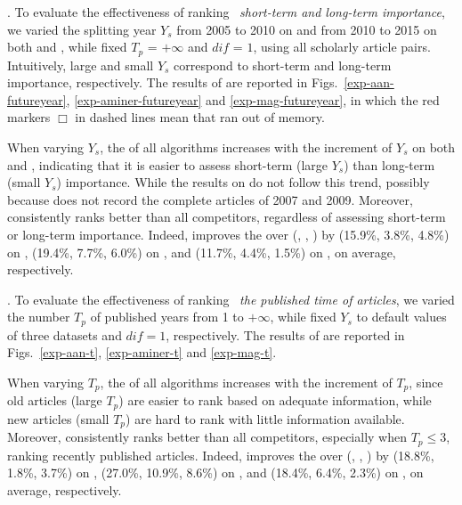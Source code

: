 .
To evaluate the effectiveness of ranking \wrt\ {\em short-term and long-term importance},
we varied the splitting year $Y_s$ from 2005 to 2010 on \aan and from 2010 to 2015 on both \aminer and \magdata, while fixed $T_p$ = $+\infty$ and $dif$ = $1$, \ie using all scholarly article pairs.
%
Intuitively, large and small $Y_s$ correspond to short-term and long-term importance, respectively.
The results of \PairAcc are reported in Figs.~\ref{exp-aan-futureyear}, \ref{exp-aminer-futureyear} and \ref{exp-mag-futureyear}, in which the red markers $\Box$ in dashed lines mean that \hhgrank ran out of memory.


When varying $Y_s$, the \PairAcc of all algorithms increases with the increment of $Y_s$ on both \aminer and \magdata, indicating that it is easier to assess short-term (large $Y_s$) than long-term (small $Y_s$) importance. While the results on \aan do not follow this trend, possibly because \aan does not record the complete articles of 2007 and 2009.
Moreover, \ensemblerank consistently ranks better than all competitors, regardless of assessing short-term or long-term importance.
Indeed, \ensemblerank improves the \PairAcc over (\pagerank, \futurerank, \hhgrank) by (15.9\%, 3.8\%, 4.8\%) on \aan, (19.4\%, 7.7\%, 6.0\%) on \aminer, and  (11.7\%, 4.4\%, 1.5\%) on \magdata, on average, respectively.



.
To evaluate the effectiveness of ranking \wrt\ {\em the published time of articles},
we varied the number $T_p$ of published years from 1 to $+\infty$, while fixed $Y_s$ to default values of three datasets and $dif=1$, respectively. The results of \PairAcc are reported in Figs.~\ref{exp-aan-t}, \ref{exp-aminer-t} and \ref{exp-mag-t}.


When varying $T_p$, the \PairAcc of all algorithms increases with the increment of $T_p$, since old articles (large $T_p$) are easier to rank based on adequate information, while new articles (small $T_p$) are hard to rank with little information available. Moreover, \ensemblerank consistently ranks better than all competitors, especially when $T_p\le3$, \ie ranking recently published articles. Indeed, \ensemblerank improves the \PairAcc over (\pagerank, \futurerank, \hhgrank) by (18.8\%, 1.8\%, 3.7\%) on \aan, (27.0\%, 10.9\%, 8.6\%) on \aminer, and (18.4\%, 6.4\%, 2.3\%) on \magdata, on average, respectively.


